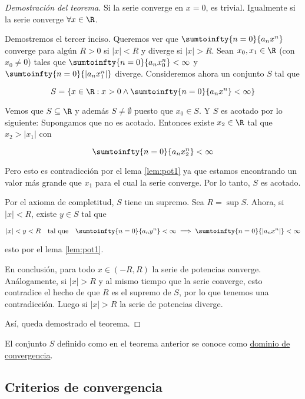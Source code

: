 \begin{proof}[Demostración del teorema]
    Si la serie converge en $x=0$, es trivial. Igualmente si la serie converge $\forall x \in \R$.
    
    Demostremos el tercer inciso. Queremos ver que $\sumtoinfty{n=0}{a_nx^n}$ converge para algún $R > 0$ si $|x| < R$ y diverge si $|x| > R$. Sean $x_0, x_1 \in \R$ (con $x_0 \neq 0$) tales que $\sumtoinfty{n=0}{a_nx_0^n} < \infty$ y $\sumtoinfty{n=0}{|a_nx_1^n|}$ diverge. Consideremos ahora un conjunto $S$ tal que
    
    \[
    S = \left\{ x \in \R : x > 0 \wedge \sumtoinfty{n=0}{a_nx^n} < \infty \right\}
    \]
    
    Vemos que $S \subseteq \R$ y además $S \neq \emptyset$ puesto que $x_0 \in S$. Y $S$ es acotado por lo siguiente: Supongamos que no es acotado. Entonces existe $x_2 \in \R$ tal que $x_2 > |x_1|$ con
    
    \[
    \sumtoinfty{n=0}{a_nx_2^n} < \infty
    \]
    
    Pero esto es contradicción por el lema \ref{lem:pot1} ya que estamos encontrando un valor más grande que $x_1$ para el cual la serie converge. Por lo tanto, $S$ es acotado.
    
    Por el axioma de completitud, $S$ tiene un supremo. Sea $R = \sup S$. Ahora, si $|x| < R$, existe $y \in S$ tal que
    
    \[
    |x| < y < R \quad \text{tal que} \quad \sumtoinfty{n=0}{a_ny^n} < \infty \implies \sumtoinfty{n=0}{|a_nx^n|} < \infty
    \]
    
    \noindent esto por el lema \ref{lem:pot1}.
    
    En conclusión, para todo $x \in (-R, R)$ la serie de potencias converge. Análogamente, si $|x| > R$ y al mismo tiempo que la serie converge, esto contradice el hecho de que $R$ es el supremo de $S$, por lo que tenemos una contradicción. Luego si $|x| > R$ la serie de potencias diverge.
    
    Así, queda demostrado el teorema.
\end{proof}

\begin{defn}
    El conjunto $S$ definido como en el teorema anterior se conoce como \ul{dominio de convergencia}.
\end{defn}

\subsection{Criterios de convergencia}

